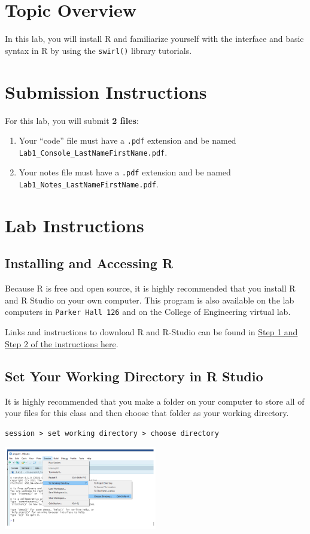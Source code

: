 \documentclass{article}
\begin{document}
\section*{Topic Overview}
In this lab, you will install R and familiarize yourself with the interface and basic syntax in R by using the \texttt{swirl()} library tutorials.

\section*{Submission Instructions}
For this lab, you will submit \textbf{2 files}:
\begin{enumerate}
    \item Your “code” file must have a \texttt{.pdf} extension and be named \texttt{Lab1\_Console\_LastNameFirstName.pdf}.
    \item Your notes file must have a \texttt{.pdf} extension and be named \texttt{Lab1\_Notes\_LastNameFirstName.pdf}.
\end{enumerate}

\section*{Lab Instructions}
\subsection*{Installing and Accessing R}
Because R is free and open source, it is highly recommended that you install R and R Studio on your own computer. This program is also available on the lab computers in \texttt{Parker Hall 126} and on the College of Engineering virtual lab.

Links and instructions to download R and R-Studio can be found in \href{https://swirlstats.com/students.html}{Step 1 and Step 2 of the instructions here}.

\subsection*{Set Your Working Directory in R Studio}
It is highly recommended that you make a folder on your computer to store all of your files for this class and then choose that folder as your working directory.

\begin{verbatim}
session > set working directory > choose directory
\end{verbatim}
\begin{center}
    \includegraphics[width=0.5\textwidth]{3611_p1.png}
\end{center}
\end{document}
